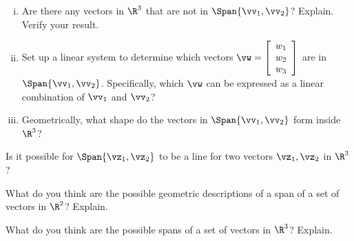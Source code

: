 \begin{activity}
\begin{enumerate}[i.]
        

		\item Are there any vectors in $\R^3$ that are not in $\Span\{\vv_1, \vv_2\}$? Explain. Verify your result.



		\item Set up a linear system to determine which vectors $\vw= \left[ \begin{array}{c} w_1 \\ w_2\\ w_3 \end{array} \right]$ are in $\Span\{\vv_1, \vv_2\}$. Specifically, which $\vw$ can be expressed as a linear combination of $\vv_1$ and $\vv_2$?

    
		
		\item Geometrically, what shape do the vectors in $\Span\{\vv_1, \vv_2\}$ form inside $\R^3$?
		
		\end{enumerate}
		

\item Is it possible for $\Span\{\vz_1, \vz_2\}$ to be a line for two vectors $\vz_1, \vz_2$ in $\R^3$?
		
	
    \item What do you think are the possible geometric descriptions of a span of a set of vectors in $\R^2$? Explain.

    

    \item What do you think are the possible spans of a set of vectors in $\R^3$? Explain.

    

    \ea
\end{activity}



\ExampleIntro

